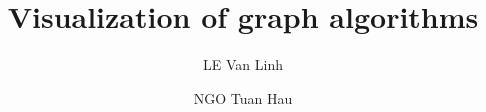 \documentclass{article}
\title{Visualization of graph algorithms}
\author{\textsc{LE} Van Linh \and \textsc{NGO} Tuan Hau}
\begin{document}
\maketitle
\begin{center}

\end{center}
%







\end{document}
